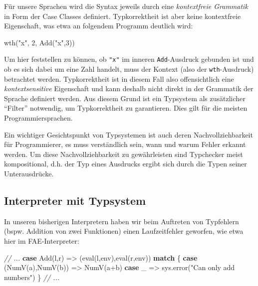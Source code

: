 \documentclass[]{article}
\newenvironment{Shaded}{}{}
\newcommand{\CommentTok}[1]{\textcolor[rgb]{0.38,0.63,0.69}{\textit{#1}}}
\newcommand{\DecValTok}[1]{\textcolor[rgb]{0.25,0.63,0.44}{#1}}
\newcommand{\FunctionTok}[1]{\textcolor[rgb]{0.02,0.16,0.49}{#1}}
\newcommand{\KeywordTok}[1]{\textcolor[rgb]{0.00,0.44,0.13}{\textbf{#1}}}
\newcommand{\NormalTok}[1]{#1}
\newcommand{\StringTok}[1]{\textcolor[rgb]{0.25,0.44,0.63}{#1}}
\begin{document}
Für unsere Sprachen wird die Syntax jeweils durch eine
\emph{kontextfreie Grammatik} in Form der Case Classes definiert.
Typkorrektheit ist aber keine kontextfreie Eigenschaft, was etwa an
folgendem Programm deutlich wird:

\begin{Shaded}
\begin{Highlighting}[]
\FunctionTok{wth}\NormalTok{(}\StringTok{"x"}\NormalTok{, }\DecValTok{2}\NormalTok{, }\FunctionTok{Add}\NormalTok{(}\StringTok{"x"}\NormalTok{,}\DecValTok{3}\NormalTok{))}
\end{Highlighting}
\end{Shaded}

Um hier feststellen zu können, ob \texttt{"x"} im inneren
\texttt{Add}-Ausdruck gebunden ist und ob es sich dabei um eine Zahl
handelt, muss der Kontext (also der \texttt{wth}-Ausdruck) betrachtet
werden. Typkorrektheit ist in diesem Fall also offensichtlich eine
\emph{kontextsensitive} Eigenschaft und kann deshalb nicht direkt in der
Grammatik der Sprache definiert werden. Aus diesem Grund ist ein
Typsystem als zusätzlicher ``Filter'' notwendig, um Typkorrektheit zu
garantieren. Dies gilt für die meisten Programmiersprachen.

Ein wichtiger Gesichtspunkt von Typsystemen ist auch deren
Nachvollziehbarkeit für Programmierer, es muss verständlich sein, wann
und warum Fehler erkannt werden. Um diese Nachvollziehbarkeit zu
gewährleisten sind Typchecker meist kompositional, d.h. der Typ eines
Ausdrucks ergibt sich durch die Typen seiner Unterausdrücke.

\hypertarget{interpreter-mit-typsystem}{%
\subsection{Interpreter mit Typsystem}\label{interpreter-mit-typsystem}}

In unseren bisherigen Interpretern haben wir beim Auftreten von
Typfehlern (bspw. Addition von zwei Funktionen) einen Laufzeitfehler
geworfen, wie etwa hier im FAE-Interpreter:

\begin{Shaded}
\begin{Highlighting}[]
\CommentTok{// ...}
  \KeywordTok{case} \FunctionTok{Add}\NormalTok{(l,r) =\textgreater{} (}\FunctionTok{eval}\NormalTok{(l,env),}\FunctionTok{eval}\NormalTok{(r,env)) }\KeywordTok{match}\NormalTok{ \{}
    \KeywordTok{case}\NormalTok{ (}\FunctionTok{NumV}\NormalTok{(a),}\FunctionTok{NumV}\NormalTok{(b)) =\textgreater{} }\FunctionTok{NumV}\NormalTok{(a+b)}
    \KeywordTok{case}\NormalTok{ \_ =\textgreater{} sys.}\FunctionTok{error}\NormalTok{(}\StringTok{"Can only add numbers"}\NormalTok{)}
\NormalTok{  \}}
\CommentTok{// ...}
\end{Highlighting}
\end{Shaded}
\end{document}
